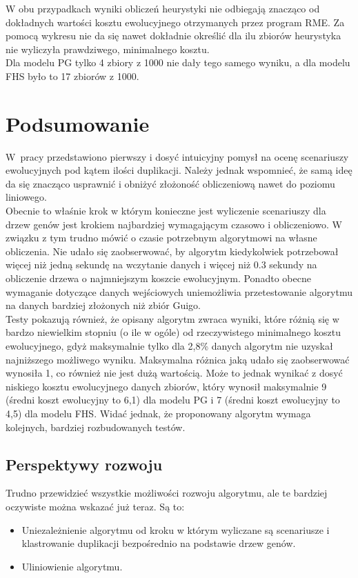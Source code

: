 \documentclass[licencjacka]{pracamgr}
\begin{document}
W obu przypadkach wyniki obliczeń heurystyki nie odbiegają znacząco od dokładnych wartości kosztu ewolucyjnego otrzymanych przez program RME. Za pomocą wykresu nie da się nawet dokładnie określić dla ilu zbiorów heurystyka nie wyliczyła prawdziwego, minimalnego kosztu.\\
Dla modelu PG tylko 4 zbiory z 1000 nie dały tego samego wyniku, a dla modelu FHS było to 17 zbiorów z 1000.

\chapter{Podsumowanie}

W~pracy przedstawiono pierwszy i dosyć intuicyjny pomysł na ocenę scenariuszy ewolucyjnych pod kątem ilości duplikacji. Należy jednak wspomnieć, że samą ideę da się znacząco usprawnić i obniżyć złożoność obliczeniową nawet do poziomu liniowego. 
\\
Obecnie to właśnie krok w którym konieczne jest wyliczenie scenariuszy dla drzew genów jest krokiem najbardziej wymagającym czasowo i obliczeniowo.  W związku z tym trudno mówić o czasie potrzebnym algorytmowi na własne obliczenia. Nie udało się zaobserwować, by algorytm kiedykolwiek potrzebował więcej niż jedną sekundę na wczytanie danych i więcej niż 0.3 sekundy na obliczenie drzewa o najmniejszym koszcie ewolucyjnym. Ponadto obecne wymaganie dotyczące danych wejściowych uniemożliwia  przetestowanie algorytmu na danych bardziej złożonych niż zbiór Guigo. 
\\
Testy pokazują również, że opisany algorytm zwraca wyniki, które różnią się w bardzo niewielkim stopniu (o ile w ogóle) od rzeczywistego minimalnego kosztu ewolucyjnego, gdyż maksymalnie tylko dla 2,8\% danych algorytm nie uzyskał najniższego możliwego wyniku. Maksymalna różnica jaką udało się zaobserwować wynosiła 1, co również nie jest dużą wartością. Może to jednak wynikać z dosyć niskiego kosztu ewolucyjnego danych zbiorów, który wynosił maksymalnie 9 (średni koszt ewolucyjny to 6,1) dla modelu PG i 7 (średni koszt ewolucyjny to 4,5) dla modelu FHS. Widać jednak, że proponowany algorytm wymaga kolejnych, bardziej rozbudowanych testów.


\section{Perspektywy rozwoju}

Trudno przewidzieć wszystkie możliwości rozwoju algorytmu, ale te bardziej
oczywiste można wskazać już teraz.  Są to:
\begin{itemize}
\item Uniezależnienie algorytmu od kroku w którym wyliczane są scenariusze i klastrowanie duplikacji bezpośrednio na podstawie drzew genów.
\item Uliniowienie algorytmu.
\end{itemize}
\end{document}
